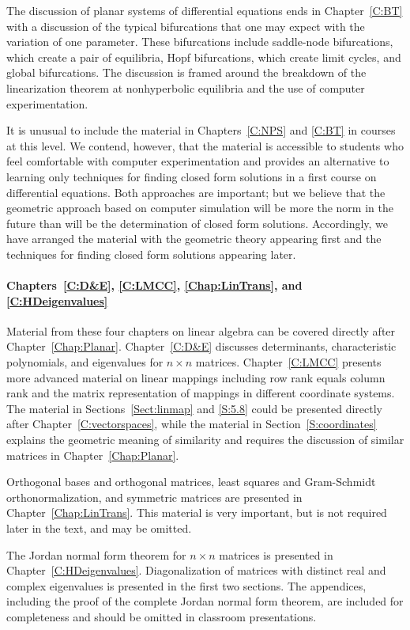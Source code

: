 The discussion of planar systems of differential equations ends in
Chapter~\ref{C:BT} with a discussion of the typical bifurcations that one 
may expect with the variation of one parameter.  These bifurcations include
saddle-node bifurcations, which create a pair of equilibria, Hopf
bifurcations, which create limit cycles, and global bifurcations.  The
discussion is framed around the breakdown of the linearization theorem at
nonhyperbolic equilibria and the use of computer experimentation.  

It is unusual to include the material in Chapters~\ref{C:NPS} and \ref{C:BT}
in courses at this level.  We contend, however, that the material is
accessible to students who feel comfortable with computer experimentation and
provides an alternative to learning only techniques for finding closed form 
solutions in a first course on differential equations.  Both approaches
are important; but we believe that the geometric approach based on computer
simulation will be more the norm in the future than will be the determination
of closed form solutions.  Accordingly, we have arranged the material with
the geometric theory appearing first and the techniques for finding closed
form solutions appearing later.

\paragraph{Chapters~\ref{C:D&E}, \ref{C:LMCC}, \ref{Chap:LinTrans}, and 
\ref{C:HDeigenvalues}}  Material from these four chapters on linear algebra
can be covered directly after Chapter~\ref{Chap:Planar}. Chapter~\ref{C:D&E} 
discusses determinants, characteristic polynomials, and eigenvalues for
$n\times n$ matrices.  Chapter~\ref{C:LMCC} presents more advanced
material on linear mappings including row rank equals column rank and the
matrix representation of mappings in different coordinate systems.  The 
material in Sections~\ref{Sect:linmap} and \ref{S:5.8} could be presented 
directly after Chapter~\ref{C:vectorspaces}, while the material in
Section~\ref{S:coordinates} explains the geometric meaning of similarity and 
requires the discussion of similar matrices in Chapter~\ref{Chap:Planar}.  

Orthogonal bases and orthogonal matrices, least squares and Gram-Schmidt
orthonormalization, and symmetric matrices are presented in 
Chapter~\ref{Chap:LinTrans}.  This material is very important, but is not 
required later in the text, and may be omitted.

The Jordan normal form theorem for $n\times n$ matrices is presented in 
Chapter~\ref{C:HDeigenvalues}.  Diagonalization of matrices with distinct
real and complex eigenvalues is presented in the first two sections.  The
appendices, including the proof of the complete Jordan normal form theorem,
are included for completeness and should be omitted in classroom
presentations.

